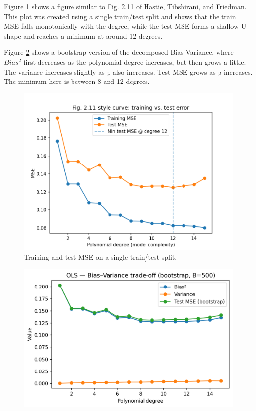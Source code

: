 \documentclass[amssymb,twocolumn,aps]{revtex4-2}
\begin{document}
Figure \ref{fig:fig2.11} shows a figure similar to Fig. 2.11 of Hastie, Tibshirani, and Friedman. This plot was created using a single train/test split and shows that the train MSE falls monotonically with the degree, while the test MSE forms a shallow U-shape and reaches a minimum at around 12 degrees. 

Figure \ref{fig:g_ols} shows a bootstrap version of the decomposed Bias-Variance, where $Bias^2$ first decreases as the polynomial degree increases, but then grows a little. The variance increases slightly as p also increases. Test MSE grows as p increases. The minimum here is between 8 and 12 degrees. 

\begin{figure}[H]
    \centering
    \includegraphics[width=1\linewidth]{Project-1/Figures/fig2.11_style.png}
    \caption{Training and test MSE on a single train/test split.  }
    \label{fig:fig2.11}
\end{figure}

\begin{figure}[H]
    \centering
    \includegraphics[width=1\linewidth]{Project-1/Figures/g_ols_bias_variance_bootstrap.png}
    \caption{}
    \label{fig:g_ols}
\end{figure}
\end{document}
